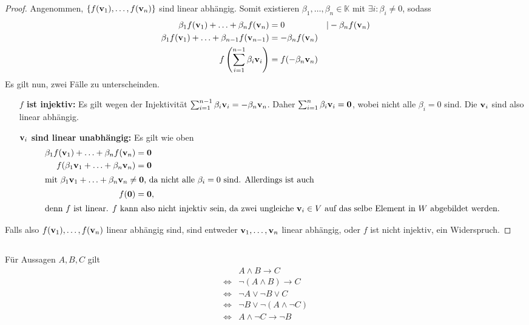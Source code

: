 \documentclass{../mfa}
\begin{document}
\begin{proof}
   Angenommen, $\{f(\mathbf{v}_{1}), \ldots, f(\mathbf{v}_{n})\}$ sind linear abhängig. Somit
   existieren $\beta_1, \ldots, \beta_n \in \mathbb{K}$  mit $\exists i : \beta_i \neq
   0$, sodass
   \begin{align*}
      \beta_1 f(\mathbf{v}_{1}) + \ldots + \beta_n f(\mathbf{v}_{n}) &= 0 & | -\beta_n f(\mathbf{v}_{n})\\
      \beta_1 f(\mathbf{v}_{1}) + \ldots + \beta_{n-1} f(\mathbf{v}_{n-1}) &= -\beta_n f(\mathbf{v}_{n})\\
      f\left(\sum_{i=1}^{n-1}\beta_i \mathbf{v}_{i}\right) &=f(-\beta_n \mathbf{v}_{n})
   \end{align*}
   Es gilt nun, zwei Fälle zu unterscheinden.
   \begin{itemize}[align=left]
      \item[\bfseries $f$ ist injektiv:] Es gilt wegen der Injektivität
         $\sum_{i=1}^{n-1}\beta_i \mathbf{v}_{i} = -\beta_n \mathbf{v}_{n}$. Daher
         $\sum_{i=1}^{n}\beta_i \mathbf{v}_{i} = \mathbf{0}$, wobei nicht
         alle $\beta_i = 0$ sind. Die $\mathbf{v}_{i}$ sind also linear abhängig.
      \item[\bfseries $\mathbf{v}_{i}$ sind linear unabhängig:] Es gilt wie oben
         \begin{align*}
            \beta_1 f(\mathbf{v}_{1}) + \ldots + \beta_n f(\mathbf{v}_{n}) &= \mathbf{0} \\
            f(\beta_1 \mathbf{v}_{1} + \ldots + \beta_n \mathbf{v}_{n}) &= \mathbf{0} \\
            \intertext{mit $\beta_1 \mathbf{v}_{1} + \ldots + \beta_n \mathbf{v}_{n} \neq \mathbf{0}$, da
            nicht alle $\beta_i = 0$ sind. Allerdings ist auch}
            f(\mathbf{0}) &= \mathbf{0}, \\
            \intertext{denn $f$ ist linear. $f$ kann also nicht injektiv sein,
            da zwei ungleiche $\mathbf{v}_{i} \in V$ auf das selbe Element in $W$
         abgebildet werden.}
         \end{align*}
   \end{itemize}
   Falls also $f(\mathbf{v}_{1}), \ldots, f(\mathbf{v}_{n})$ linear abhängig sind, sind entweder
   $\mathbf{v}_{1}, \ldots, \mathbf{v}_{n}$ linear abhängig, oder $f$ ist nicht injektiv, ein
   Widerspruch.
\end{proof}

\subsection{}

Für Aussagen $A, B, C$ gilt 
\begin{align*}
   & A \wedge B  \rightarrow C \\
   \Leftrightarrow & \neg (A \wedge B)  \rightarrow C \\
   \Leftrightarrow & \neg A \vee \neg B  \vee C \\
   \Leftrightarrow & \neg B  \vee \neg (A \wedge \neg C) \\
   \Leftrightarrow & A \wedge \neg C  \rightarrow \neg B
\end{align*}
\end{document}
